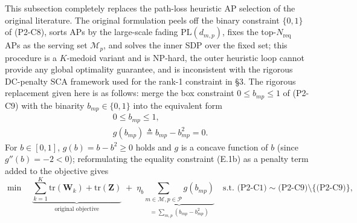\documentclass[12pt,a4paper]{article}
\newcommand{\mat}[1]{\mathbf{#1}}
\newcommand{\tr}{\text{tr}}
\begin{document}
This subsection completely replaces the path-loss heuristic AP selection of the original literature. The original formulation peels off the binary constraint $\{0,1\}$ of (P2-C8), sorts APs by the large-scale fading $\text{PL}(d_{m,p})$, fixes the top-$N_{\text{req}}$ APs as the serving set $\mathcal{M}_p$, and solves the inner SDP over the fixed set; this procedure is a $K$-medoid variant and is NP-hard, the outer heuristic loop cannot provide any global optimality guarantee, and is inconsistent with the rigorous DC-penalty SCA framework used for the rank-1 constraint in \S3. The rigorous replacement given here is as follows: merge the box constraint $0 \leq b_{mp} \leq 1$ of (P2-C9) with the binarity $b_{mp} \in \{0,1\}$ into the equivalent form
\begin{subequations}\label{eq:b-rewrite}
\begin{align}
& 0 \leq b_{mp} \leq 1, \tag{E.1a} \\
& g(b_{mp}) \triangleq b_{mp} - b_{mp}^2 = 0. \tag{E.1b}
\end{align}
\end{subequations}
For $b \in [0,1]$, $g(b) = b - b^2 \geq 0$ holds and $g$ is a concave function of $b$ (since $g''(b) = -2 < 0$); reformulating the equality constraint (E.1b) as a penalty term added to the objective gives
\begin{equation}
\min \quad \underbrace{\sum_{k=1}^K \tr(\mat{W}_k) + \tr(\mat{Z})}_{\text{original objective}} \; + \; \eta_b \underbrace{\sum_{m \in \mathcal{M}, p \in \mathcal{P}} g(b_{mp})}_{= \sum_{m,p} (b_{mp} - b_{mp}^2)} \quad \text{s.t. (P2-C1)} \sim \text{(P2-C9)} \setminus \{\text{(P2-C9)}\}, \tag{P2-DCP}
\end{equation}
\end{document}
